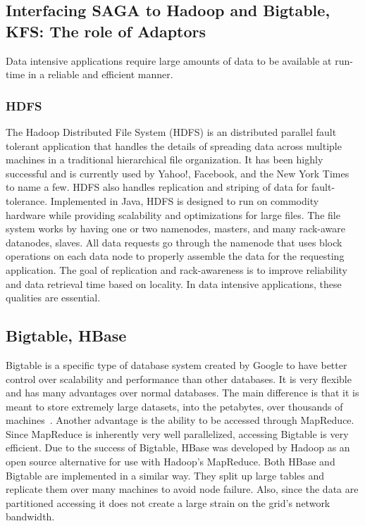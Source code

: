 \documentclass[conference,final]{IEEEtran}
\begin{document}
\subsection{Interfacing SAGA to Hadoop and Bigtable, KFS: The role of
  Adaptors}



Data intensive applications require large amounts
of data to be available at run-time in a reliable and efficient
manner. 

\subsubsection{HDFS}
The Hadoop Distributed File System (HDFS) is an distributed parallel
fault tolerant application that handles the details of spreading data
across multiple machines in a traditional hierarchical file
organization.  It has been highly successful and is currently used by
Yahoo!, Facebook, and the New York Times to name a few.  HDFS also
handles replication and striping of data for fault-tolerance.
Implemented in Java, HDFS is designed to run on commodity hardware
while providing scalability and optimizations for large files.  The
file system works by having one or two namenodes, masters, and many
rack-aware datanodes, slaves.  All data requests go through the
namenode that uses block operations on each data node to properly
assemble the data for the requesting application.  The goal of
replication and rack-awareness is to improve reliability and data
retrieval time based on locality.  In data intensive applications,
these qualities are essential.

\subsection*{Bigtable, HBase}

Bigtable is a specific type of database system created by Google to
have better control over scalability and performance than other
databases.  It is very flexible and has many advantages over normal
databases.  The main difference is that it is meant to store extremely
large datasets, into the petabytes, over thousands of
machines~\cite{bigtable}.  Another advantage is the ability to be
accessed through MapReduce.  Since MapReduce is inherently very well
parallelized, accessing Bigtable is very efficient.  Due to the
success of Bigtable, HBase was developed by Hadoop as an open source
alternative for use with Hadoop's MapReduce.  Both HBase and Bigtable
are implemented in a similar way.  They split up large tables and
replicate them over many machines to avoid node failure.  Also, since
the data are partitioned accessing it does not create a large strain
on the grid's network bandwidth.
\end{document}
